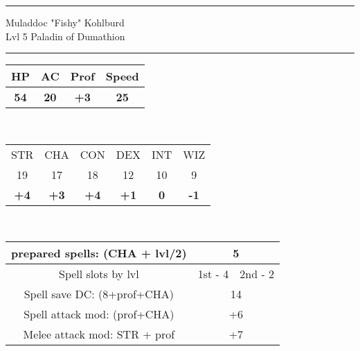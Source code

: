 \documentclass[12pt, xcolor={dvipsnames}]{beamer}
\newcommand{\str}{{\color{red}STR}}
\newcommand{\con}{{\color{red}CON}}
\newcommand{\wiz}{{\color{red}WIZ}}
\newcommand{\dex}{{\color{red}DEX}}
\newcommand{\inte}{{\color{red}INT}}
\newcommand{\cha}{{\color{red}CHA}}
\begin{document}
\begin{frame}
  \large
  \centering
  \vspace{.5em}
  \hrule
  \vspace{.5em}
  {\color{blue}Muladdoc "Fishy" Kohlburd}\\
  \normalsize{{\color{Cerulean} Lvl 5} \color{OliveGreen}Paladin of Dumathion}\\
  \vspace{.5em}
  \hrule
  \vspace{.5em}
  \small
  \centering
  \begin{tabular}{|c|c|c|c|}
    \textbf{\color{Mahogany}HP} & \textbf{\color{Mahogany}AC} & Prof & Speed\\ \hline
    \textbf{54} & \textbf{20} & \textbf{+3} & \textbf{25}\\
  \end{tabular}\\
\vspace{1em}

  \begin{tabular}{|c|c|c|c|c|c|}
    {\str} & {\cha} & {\con} & {\dex} & {\inte} & {\wiz}\\
    19 & 17 & 18 & 12 & 10 & 9\\\hline
    \textbf{+4} & \textbf{+3} & \textbf{+4} & \textbf{+1} & \textbf{0} & \textbf{-1}\\
  \end{tabular}\\
  \vspace{1em}
  \begin{tabular}{|c|c|c|}
  prepared spells: ({\cha} + lvl/2) & \multicolumn{2}{|c|}{{\color{OliveGreen}5}}\\ \hline

  Spell slots by lvl & 1st - {\color{OliveGreen}4} & 2nd - {\color{OliveGreen}2}\\ \hline

  Spell save DC: (8+prof+{\cha}) & \multicolumn{2}{|c|}{{\color{OliveGreen}14}}\\ \hline

  Spell attack mod: (prof+{\cha}) & \multicolumn{2}{|c|}{{\color{OliveGreen}+6}}\\ \hline

  Melee attack mod: {\str} + prof & \multicolumn{2}{|c|}{{\color{OliveGreen} +7}}\\
\end{tabular}
\end{frame}
\end{document}

